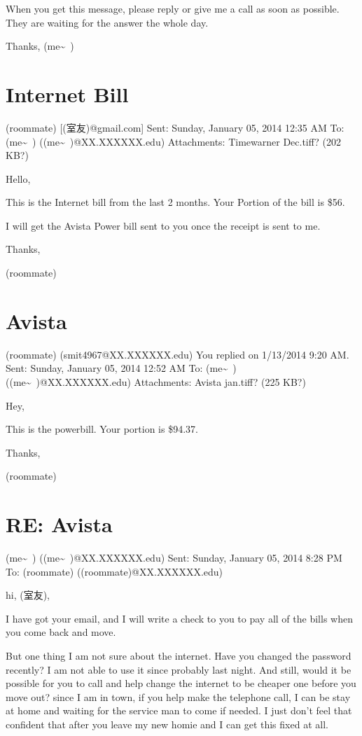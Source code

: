 \documentclass[12pt]{book}
\begin{document}
When you get this message, please reply or give me a call as soon as possible. They are waiting for the answer the whole day. 

Thanks, 
(me\textasciitilde{}~)


\section{Internet Bill}
\label{sec-16-3}
(roommate) [(室友)@gmail.com]
Sent:        Sunday, January 05, 2014 12:35 AM
To:        
(me\textasciitilde{}~) ((me\textasciitilde{}~)@XX.XXXXXX.edu)
Attachments:        
Timewarner Dec.tiff? (202 KB?)

Hello,

This is the Internet bill from the last 2 months. Your Portion of the bill is \$56.

I will get the Avista Power bill sent to you once the receipt is sent to me.

Thanks,

(roommate) 


\section{Avista}
\label{sec-16-4}
(roommate) (smit4967@XX.XXXXXX.edu)
You replied on 1/13/2014 9:20 AM.
Sent:        Sunday, January 05, 2014 12:52 AM
To:        
(me\textasciitilde{}~) ((me\textasciitilde{}~)@XX.XXXXXX.edu)
Attachments:        
Avista jan.tiff? (225 KB?)

Hey,

This is the powerbill. Your portion is \$94.37.

Thanks,

(roommate) 


\section{RE: Avista}
\label{sec-16-5}
(me\textasciitilde{}~) ((me\textasciitilde{}~)@XX.XXXXXX.edu)
Sent:        Sunday, January 05, 2014 8:28 PM
To:        
(roommate) ((roommate)@XX.XXXXXX.edu)

hi, (室友), 

I have got your email, and I will write a check to you to pay all of the bills when you come back and move. 

But one thing I am not sure about the internet. Have you changed the password recently? I am not able to use it since probably last night. And still, would it be possible for you to call and help change the internet to be cheaper one before you move out? since I am in town, if you help make the telephone call, I can be stay at home and waiting for the service man to come if needed. I just don't feel that confident that after you leave my new homie and I can get this fixed at all. 
\end{document}
